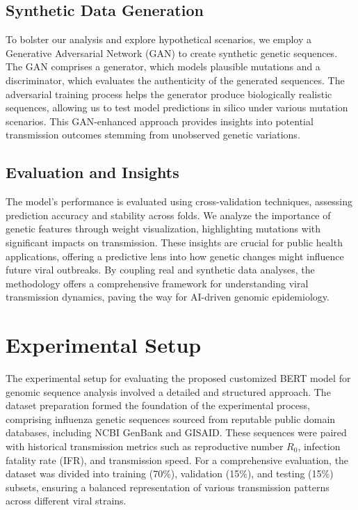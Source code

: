 \documentclass{article}
\begin{document}
\subsection*{Synthetic Data Generation}
To bolster our analysis and explore hypothetical scenarios, we employ a Generative Adversarial Network (GAN) to create synthetic genetic sequences. The GAN comprises a generator, which models plausible mutations and a discriminator, which evaluates the authenticity of the generated sequences. The adversarial training process helps the generator produce biologically realistic sequences, allowing us to test model predictions in silico under various mutation scenarios. This GAN-enhanced approach provides insights into potential transmission outcomes stemming from unobserved genetic variations.

\subsection*{Evaluation and Insights}
The model's performance is evaluated using cross-validation techniques, assessing prediction accuracy and stability across folds. We analyze the importance of genetic features through weight visualization, highlighting mutations with significant impacts on transmission. These insights are crucial for public health applications, offering a predictive lens into how genetic changes might influence future viral outbreaks. By coupling real and synthetic data analyses, the methodology offers a comprehensive framework for understanding viral transmission dynamics, paving the way for AI-driven genomic epidemiology.

\section{Experimental Setup}
The experimental setup for evaluating the proposed customized BERT model for genomic sequence analysis involved a detailed and structured approach. The dataset preparation formed the foundation of the experimental process, comprising influenza genetic sequences sourced from reputable public domain databases, including NCBI GenBank and GISAID. These sequences were paired with historical transmission metrics such as reproductive number \( R_0 \), infection fatality rate (IFR), and transmission speed. For a comprehensive evaluation, the dataset was divided into training (70\%), validation (15\%), and testing (15\%) subsets, ensuring a balanced representation of various transmission patterns across different viral strains.
\end{document}
